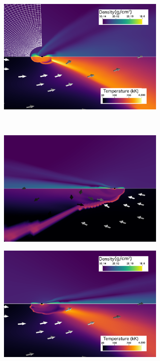 \documentclass{aa}
\begin{document}
\begin{figure}
\begin{subfigure}{0.5\textwidth}
\begin{center}
\label{fig:subim2}
\end{center}
\end{subfigure}
\begin{subfigure}{0.5\textwidth}
\begin{center}
\includegraphics[width=8.1cm]{Pictures/isoHot_2.png} 
\label{fig:subim1}
\end{center}
\end{subfigure}
\vspace*{0.8cm}\\
\hspace*{-0.2cm}
\begin{subfigure}{0.5\textwidth}
\begin{center}
\includegraphics[width=8.1cm]{Pictures/isoCold_1.png}
\label{fig:subim2}
\end{center}
\end{subfigure}
\begin{subfigure}{0.5\textwidth}
\begin{center}
\includegraphics[width=8.1cm]{Pictures/isoCold_2.png}

\end{center}
\end{subfigure}
\end{figure}
\end{document}
